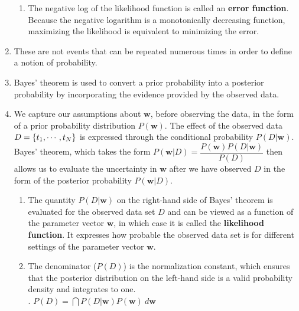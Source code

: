 \begin{enumerate}
\begin{enumerate}
        \item The negative log of the likelihood function is called an \textbf{error function}.
        Because the negative logarithm is a monotonically decreasing function, maximizing the likelihood is equivalent to minimizing the error.
        \hfill \cite{ml/book/Pattern-Recognition-And-Machine-Learning/Christopher-M-Bishop}
    \end{enumerate}

    \item These are not events that can be repeated numerous times in order to define a notion of probability.
    \hfill \cite{ml/book/Pattern-Recognition-And-Machine-Learning/Christopher-M-Bishop}

    \item Bayes' theorem is used to convert a prior probability into a posterior probability by incorporating the evidence provided by the observed data.
    \hfill \cite{ml/book/Pattern-Recognition-And-Machine-Learning/Christopher-M-Bishop}

    \item We capture our assumptions about $\bm{w}$, before observing the data, in the form of a prior probability distribution $P(\bm{w})$.
    The effect of the observed data $D = \left\{t_1, \cdots , t_N \right\}$ is expressed through the conditional probability $P(D|\bm{w})$.
    Bayes’ theorem, which takes the form
    $
        P(\bm{w}|D) = \dfrac{P(\bm{w})P(D|\bm{w})}{P(D)}
    $
    then allows us to evaluate the uncertainty in $\bm{w}$ after we have observed $D$ in the form of the posterior probability $P(\bm{w}|D)$.
    \hfill \cite{ml/book/Pattern-Recognition-And-Machine-Learning/Christopher-M-Bishop}
    \begin{enumerate}
        \item The quantity $P(D|\bm{w})$ on the right-hand side of Bayes' theorem is evaluated for the observed data set $D$ and can be viewed as a function of the parameter vector $\bm{w}$, in which case it is called the \textbf{likelihood function}.
        It expresses how probable the observed data set is for different settings of the parameter vector $\bm{w}$.
        \hfill \cite{ml/book/Pattern-Recognition-And-Machine-Learning/Christopher-M-Bishop}

        \item The denominator ($P(D)$) is the normalization constant, which ensures that the posterior distribution on the left-hand side is a valid probability density and integrates to one.
        \hfill \cite{ml/book/Pattern-Recognition-And-Machine-Learning/Christopher-M-Bishop}
        \\
        .\hfill
        $
            P(D) = \dint P(D|\bm{w})P(\bm{w})\ d\bm{w}
        $
        \hfill \cite{ml/book/Pattern-Recognition-And-Machine-Learning/Christopher-M-Bishop}


\end{enumerate}
\end{enumerate}
